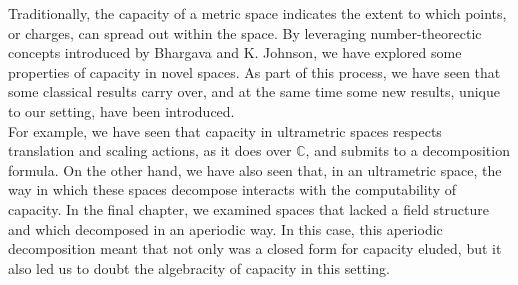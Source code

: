 Traditionally, the capacity of a metric space indicates the extent to which points, or charges, can spread out within the space. By leveraging number-theorectic concepts introduced by Bhargava and K. Johnson, we have explored some properties of capacity in novel spaces.  As part of this process, we have seen that some classical results carry over, and at the same time some new results, unique to our setting, have been introduced.\\

For example, we have seen that capacity in ultrametric spaces respects translation and scaling actions, as it does over $\mathbb{C}$, and submits to a decomposition formula. On the other hand, we have also seen that, in an ultrametric space, the way in which these spaces decompose interacts with the computability of capacity. In the final chapter, we examined spaces that lacked a field structure and which decomposed in an aperiodic way. In this case, this aperiodic decomposition meant that not only was a closed form for capacity eluded, but it also led us to doubt the algebracity of capacity in this setting.
